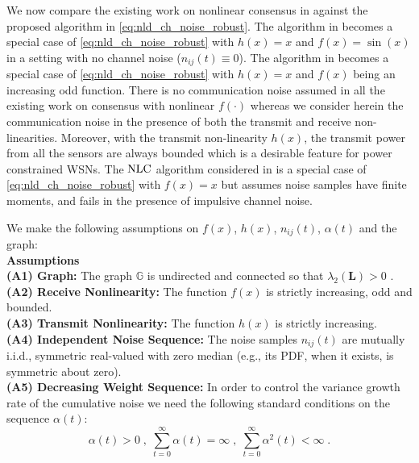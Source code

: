 \documentclass[onecolumn, draft, 12pt]{IEEEtran}
\newcommand{\G}{\mathbb{G}}
\newcommand{\nld}{\rm NLC}
\newcommand{\La}{\mathbf{L}}
\begin{document}
We now compare the existing work on nonlinear consensus in \cite{KhanKar,OlfatiSaber2003,Ulrich2008,HuiWassim2008,WenwuChen2011,Ajorlou2011} against the proposed algorithm in \eqref{eq:nld_ch_noise_robust}. The algorithm in \cite{KhanKar} becomes a special case of \eqref{eq:nld_ch_noise_robust} with $h(x)=x$ and $f(x)=\sin(x)$ in a setting with no channel noise ($n_{ij}(t) \equiv 0$). The algorithm in \cite{OlfatiSaber2003} becomes a special case of \eqref{eq:nld_ch_noise_robust} with $h(x)=x$ and $f(x)$ being an increasing odd function. There is no communication noise assumed in all the existing work on consensus with nonlinear $f(\cdot)$ \cite{KhanKar,OlfatiSaber2003,Ulrich2008,HuiWassim2008,WenwuChen2011,Ajorlou2011} whereas we consider herein the communication noise in the presence of both the transmit and receive non-linearities. Moreover, with the transmit non-linearity $h(x)$, the transmit power from all the sensors are always bounded which is a desirable feature for power constrained WSNs. The $\nld$ algorithm considered in \cite{dastep2013} is a special case of \eqref{eq:nld_ch_noise_robust} with $f(x)=x$ but assumes noise samples have finite moments, and fails in the presence of impulsive channel noise.

We make the following assumptions on $f(x)$, $h(x)$, $n_{ij}(t)$, $\alpha(t)$ and the graph: 
\\
\textbf{Assumptions \;}\\
\textbf{(A1) Graph:\;} The graph $\G$ is undirected and connected so that $\lambda_2 (\La) > 0$ \cite{chung}.\\
\textbf{(A2) Receive Nonlinearity:\;} The function $f(x)$ is strictly increasing, odd and bounded.\\   
\textbf{(A3) Transmit Nonlinearity:\;} The function $h(x)$ is strictly increasing.\\ 
\textbf{(A4) Independent Noise Sequence:\;} The noise samples $n_{ij}(t)$ are mutually i.i.d., symmetric real-valued with zero median (e.g., its PDF, when it exists, is symmetric about zero). \\  
\textbf{(A5) Decreasing Weight Sequence:\;} In order to control the variance growth rate of the cumulative noise we need the following standard conditions on the sequence $\alpha(t)$:
\begin{equation}
\label{eq:assump_A6}
\alpha(t) >0 \;, \; \displaystyle\sum_{t=0}^{\infty} \alpha(t) =  \infty \;,  \; \displaystyle\sum_{t=0}^{\infty} \alpha^{2}(t) < \infty \;.
\end{equation} 
\end{document}

